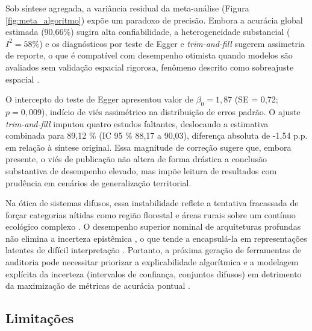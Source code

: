 Sob síntese agregada, a variância residual da meta-análise (Figura \ref{fig:meta_algoritmo}) expõe um paradoxo de precisão. Embora a acurácia global estimada (90,66\%) sugira alta confiabilidade, a heterogeneidade substancial ($I^2=58\%$) e os diagnósticos por teste de Egger e \textit{trim-and-fill} sugerem assimetria de reporte, o que é compatível com desempenho otimista quando modelos são avaliados sem validação espacial rigorosa, fenômeno descrito como sobreajuste espacial \cite{Ploton2020,Meyer2021}.

O intercepto do teste de Egger apresentou valor de $\beta_0=1{,}87$ (SE = 0,72; $p=0{,}009$), indício de viés assimétrico na distribuição de erros padrão. O ajuste \textit{trim-and-fill} imputou quatro estudos faltantes, deslocando a estimativa combinada para 89,12 \% (IC 95 \% 88,17 a 90,03), diferença absoluta de -1,54 p.p. em relação à síntese original. Essa magnitude de correção sugere que, embora presente, o viés de publicação não altera de forma drástica a conclusão substantiva de desempenho elevado, mas impõe leitura de resultados com prudência em cenários de generalização territorial.

Na ótica de sistemas difusos, essa instabilidade reflete a tentativa fracassada de forçar categorias nítidas como região florestal e áreas rurais sobre um contínuo ecológico complexo \cite{Fisher2010}. O desempenho superior nominal de arquiteturas profundas não elimina a incerteza epistêmica \cite{Hullermeier2021}, o que tende a encapsulá-la em representações latentes de difícil interpretação \cite{Tuia2021}. Portanto, a próxima geração de ferramentas de auditoria pode necessitar priorizar a explicabilidade algorítmica e a modelagem explícita da incerteza (intervalos de confiança, conjuntos difusos) em detrimento da maximização de métricas de acurácia pontual \cite{Rudin2019,Ghilardi2025}.

\subsection[Limitações]{Limitações}

